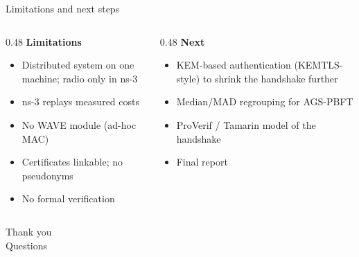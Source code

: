 \documentclass[aspectratio=169,10pt]{beamer}
\begin{document}
\begin{frame}{Limitations and next steps}
\begin{columns}[T]
\begin{column}{0.48\textwidth}
\textbf{Limitations}
\small
\begin{itemize}
\item Distributed system on one machine; radio only in ns-3
\item ns-3 replays measured costs
\item No WAVE module (ad-hoc MAC)
\item Certificates linkable; no pseudonyms
\item No formal verification
\end{itemize}
\end{column}
\begin{column}{0.48\textwidth}
\textbf{Next}
\small
\begin{itemize}
\item KEM-based authentication (KEMTLS-style) to shrink the handshake further
\item Median/MAD regrouping for AGS-PBFT
\item ProVerif / Tamarin model of the handshake
\item Final report
\end{itemize}
\end{column}
\end{columns}
\end{frame}

\begin{frame}[standout]
Thank you\\[6pt]
\normalsize Questions
\end{frame}
\end{document}
